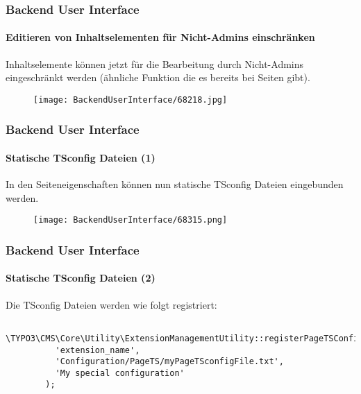 \begin{frame}[fragile]
	\frametitle{Backend User Interface}
	\framesubtitle{Editieren von Inhaltselementen für Nicht-Admins einschränken}

	Inhaltselemente können jetzt für die Bearbeitung durch Nicht-Admins eingeschränkt werden
	(ähnliche Funktion die es bereits bei Seiten gibt).

	\begin{figure}
		\texttt{[image: BackendUserInterface/68218.jpg]}
	\end{figure}

\end{frame}

\begin{frame}[fragile]
	\frametitle{Backend User Interface}
	\framesubtitle{Statische TSconfig Dateien (1)}

	In den Seiteneigenschaften können nun statische TSconfig Dateien eingebunden werden.

	\begin{figure}
		\texttt{[image: BackendUserInterface/68315.png]}
	\end{figure}

\end{frame}

\begin{frame}[fragile]
	\frametitle{Backend User Interface}
	\framesubtitle{Statische TSconfig Dateien (2)}

	\lstset{basicstyle=\tiny\ttfamily}

	Die TSconfig Dateien werden wie folgt registriert:

	\begin{lstlisting}
		\TYPO3\CMS\Core\Utility\ExtensionManagementUtility::registerPageTSConfigFile(
		  'extension_name',
		  'Configuration/PageTS/myPageTSconfigFile.txt',
		  'My special configuration'
		);
	\end{lstlisting}

\end{frame}

